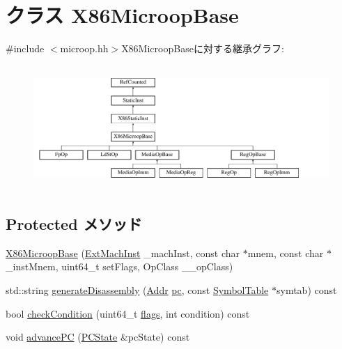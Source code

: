 \hypertarget{classX86ISA_1_1X86MicroopBase}{
\section{クラス X86MicroopBase}
\label{classX86ISA_1_1X86MicroopBase}
}


{\ttfamily \#include $<$microop.hh$>$}X86MicroopBaseに対する継承グラフ:\begin{figure}[H]
\begin{center}
\leavevmode
\includegraphics[height=4.74576cm]{classX86ISA_1_1X86MicroopBase}
\end{center}
\end{figure}
\subsection*{Protected メソッド}
\begin{DoxyCompactItemize}
\item 
\hyperlink{classX86ISA_1_1X86MicroopBase_a2a858ca567a05acc1514fc57cd910c66}{X86MicroopBase} (\hyperlink{structX86ISA_1_1ExtMachInst}{ExtMachInst} \_\-machInst, const char $\ast$mnem, const char $\ast$\_\-instMnem, uint64\_\-t setFlags, OpClass \_\-\_\-opClass)
\item 
std::string \hyperlink{classX86ISA_1_1X86MicroopBase_a95d323a22a5f07e14d6b4c9385a91896}{generateDisassembly} (\hyperlink{base_2types_8hh_af1bb03d6a4ee096394a6749f0a169232}{Addr} \hyperlink{namespaceX86ISA_aecb63c74e066ecd98e04d057e39028c9}{pc}, const \hyperlink{classSymbolTable}{SymbolTable} $\ast$symtab) const 
\item 
bool \hyperlink{classX86ISA_1_1X86MicroopBase_a833205937b579b8b3fa163faba5056ce}{checkCondition} (uint64\_\-t \hyperlink{classStaticInst_a0bf9c8a3dba6ab3f4a4b1bee48ebd0be}{flags}, int condition) const 
\item 
void \hyperlink{classX86ISA_1_1X86MicroopBase_af04cd01429462d48e635f3e01ced6257}{advancePC} (\hyperlink{classX86ISA_1_1PCState}{PCState} \&pcState) const 
\end{DoxyCompactItemize}
